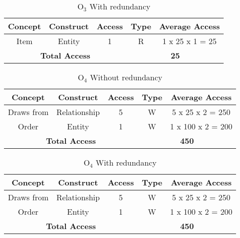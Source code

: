 \begin{table}[!h]\caption{	$ \textrm{O}_\textrm{3} $ With redundancy }
	\begin{center}
		\begin{tabular}{| c | c | c | c | c |}
			\hline
			\textbf{Concept} & \textbf{Construct} & \textbf{Access} & \textbf{Type} & \textbf{Average Access} \\ \hline
			Item & Entity & 1 & R & 1 x 25 x 1 = 25 \\ \hline
			\multicolumn{3}{|c|}{\textbf{Total Access}} & \multicolumn{2}{|c|}{\textbf{25}} \\ \hline
		\end{tabular}
	\end{center}
\end{table}
\begin{table}[!h]\caption{	$ \textrm{O}_\textrm{4} $ Without redundancy }
	\begin{center}
		\begin{tabular}{| c | c | c | c | c |}
			\hline
			\textbf{Concept} & \textbf{Construct} & \textbf{Access} & \textbf{Type} & \textbf{Average Access} \\ \hline
			Draws from & Relationship & 5 & W & 5 x 25 x 2 = 250 \\ \hline
			Order & Entity & 1 & W & 1 x 100 x 2 = 200 \\ \hline
			\multicolumn{3}{|c|}{\textbf{Total Access}} & \multicolumn{2}{|c|}{\textbf{450}} \\ \hline
		\end{tabular}
	\end{center}
\end{table}
\begin{table}[!h]\caption{	$ \textrm{O}_\textrm{4} $ With redundancy }
	\begin{center}
		\begin{tabular}{| c | c | c | c | c |}
			\hline
			\textbf{Concept} & \textbf{Construct} & \textbf{Access} & \textbf{Type} & \textbf{Average Access} \\ \hline
			Draws from & Relationship & 5 & W & 5 x 25 x 2 = 250 \\ \hline
			Order & Entity & 1 & W & 1 x 100 x 2 = 200 \\ \hline
			\multicolumn{3}{|c|}{\textbf{Total Access}} & \multicolumn{2}{|c|}{\textbf{450}} \\ \hline
		\end{tabular}
	\end{center}
\end{table}
